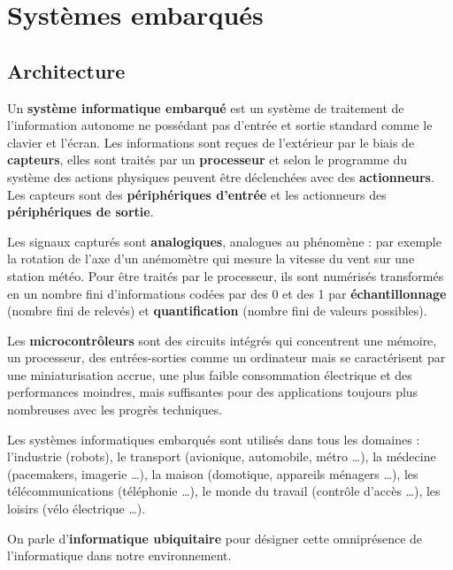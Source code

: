 
\section{Systèmes embarqués}

\subsection{Architecture}

\vspace*{-20pt}

\begin{definition}{}
Un \textbf{système informatique embarqué} est un système de traitement de l'information autonome ne possédant pas d'entrée et sortie standard comme le clavier et l'écran. Les informations sont reçues de l'extérieur par le biais de \textbf{capteurs}, elles sont traités par un \textbf{processeur} et selon le programme du système des actions physiques peuvent être déclenchées avec des \textbf{actionneurs}. Les capteurs sont des  \textbf{périphériques d'entrée} et les actionneurs des  \textbf{périphériques de sortie}.

\end{definition}


Les signaux capturés sont \textbf{analogiques}, \ie{} analogues au phénomène : par exemple la rotation de l'axe d'un anémomètre qui mesure la vitesse du vent sur une station météo. Pour être traités par le processeur, ils sont numérisés \ie{} transformés en un nombre fini d'informations codées par des 0 et des 1 par \textbf{échantillonnage} (nombre fini de relevés)  et \textbf{quantification} (nombre fini de valeurs possibles).

Les \textbf{microcontrôleurs} sont des circuits intégrés qui concentrent  une mémoire, un processeur, des entrées-sorties comme un ordinateur mais se caractérisent par une miniaturisation accrue, une plus faible consommation électrique et des performances moindres, mais suffisantes pour des applications toujours plus nombreuses avec les progrès techniques.

Les systèmes informatiques embarqués sont utilisés dans tous les domaines : l'industrie (robots), le transport (avionique, automobile, métro \ldots ), la médecine (pacemakers, imagerie \ldots), la maison (domotique, appareils ménagers \ldots), les télécommunications (téléphonie \ldots), le monde du travail (contrôle d'accès \ldots), les loisirs (vélo électrique \ldots).

On parle  d'\textbf{informatique ubiquitaire} pour désigner cette omniprésence de l'informatique dans notre environnement. 

